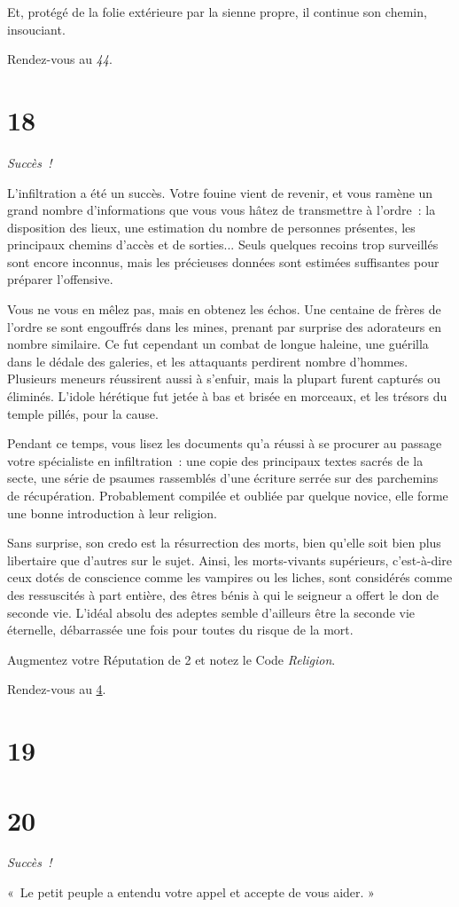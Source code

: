 \documentclass{report}
\newcommand{\gsection}[1]{
    \section{#1}
    \label{section-#1}
}
\newcommand{\glink}[1]{\hyperref[section-#1]{#1}}
\newcommand{\success}{
    \emph{Succès !}
}
\begin{document}
Et, protégé de la folie extérieure par la sienne propre, il continue son chemin, insouciant.

Rendez-vous au \emph{44}.

\gsection{18}

\success

L'infiltration a été un succès. Votre fouine vient de revenir, et vous ramène un grand nombre d'informations que vous vous hâtez de transmettre à l'ordre : la disposition des lieux, une estimation du nombre de personnes présentes, les principaux chemins d'accès et de sorties... Seuls quelques recoins trop surveillés sont encore inconnus, mais les précieuses données sont estimées suffisantes pour préparer l'offensive.

Vous ne vous en mêlez pas, mais en obtenez les échos. Une centaine de frères de l'ordre se sont engouffrés dans les mines, prenant par surprise des adorateurs en nombre similaire. Ce fut cependant un combat de longue haleine, une guérilla dans le dédale des galeries, et les attaquants perdirent nombre d'hommes. Plusieurs meneurs réussirent aussi à s'enfuir, mais la plupart furent capturés ou éliminés. L'idole hérétique fut jetée à bas et brisée en morceaux, et les trésors du temple pillés, pour la cause.

Pendant ce temps, vous lisez les documents qu'a réussi à se procurer au passage votre spécialiste en infiltration : une copie des principaux textes sacrés de la secte, une série de psaumes rassemblés d'une écriture serrée sur des parchemins de récupération. Probablement compilée et oubliée par quelque novice, elle forme une bonne introduction à leur religion.

Sans surprise, son credo est la résurrection des morts, bien qu'elle soit bien plus libertaire que d'autres sur le sujet. Ainsi, les morts-vivants supérieurs, c'est-à-dire ceux dotés de conscience comme les vampires ou les liches, sont considérés comme des ressuscités à part entière, des êtres bénis à qui le seigneur a offert le don de seconde vie. L'idéal absolu des adeptes semble d'ailleurs être la seconde vie éternelle, débarrassée une fois pour toutes du risque de la mort.

Augmentez votre Réputation de 2 et notez le Code \emph{Religion}.

Rendez-vous au \glink{4}.

\gsection{19}

\gsection{20}

\success

« Le petit peuple a entendu votre appel et accepte de vous aider. »
\end{document}
